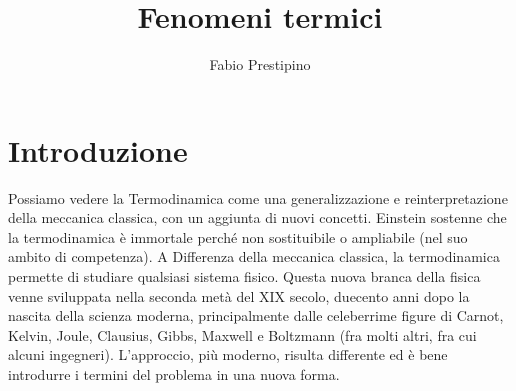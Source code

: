 \documentclass[10pt,a4paper]{article}
\author{Fabio Prestipino}
\title{Fenomeni termici}
\begin{document}
	\maketitle
\section{Introduzione}
	Possiamo vedere la Termodinamica come una generalizzazione e reinterpretazione della meccanica classica, con un aggiunta di nuovi concetti. Einstein sostenne che la termodinamica è immortale perché non sostituibile o ampliabile (nel suo ambito di competenza). A Differenza della meccanica classica, la termodinamica permette di studiare qualsiasi sistema fisico. Questa nuova branca della fisica venne sviluppata nella seconda metà del XIX secolo, duecento anni dopo la nascita della scienza moderna, principalmente dalle celeberrime figure di Carnot, Kelvin, Joule, Clausius, Gibbs, Maxwell e Boltzmann (fra molti altri, fra cui alcuni ingegneri). L'approccio, più moderno, risulta differente ed è bene introdurre i termini del problema in una nuova forma.\\
\end{document}
